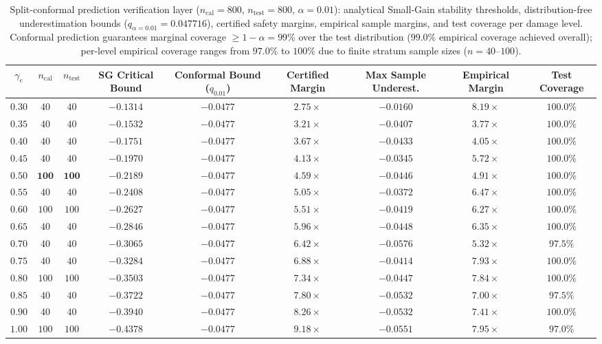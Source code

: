 \documentclass[review,12pt]{elsarticle}
\begin{document}
\begin{table}[!htbp]
\centering
\caption{Split-conformal prediction verification layer ($n_{\text{cal}} = 800$, $n_{\text{test}} = 800$, $\alpha = 0.01$): analytical Small-Gain stability thresholds, distribution-free underestimation bounds ($q_{\alpha=0.01} = 0.047716$), certified safety margins, empirical sample margins, and test coverage per damage level. Conformal prediction guarantees marginal coverage $\ge 1-\alpha = 99\%$ over the test distribution ($99.0\%$ empirical coverage achieved overall); per-level empirical coverage ranges from $97.0\%$ to $100\%$ due to finite stratum sample sizes ($n=40\text{--}100$).}
\label{tab:conformal_certification}
\scriptsize
\setlength{\tabcolsep}{3pt}
\begin{adjustbox}{max width=\textwidth}
\begin{tabular}{ccccccccc}
\toprule
$\gamma_e$ & $n_{\text{cal}}$ & $n_{\text{test}}$ & SG Critical Bound & Conformal Bound ($q_{0.01}$) & Certified Margin & Max Sample Underest. & Empirical Margin & Test Coverage \\
\midrule
$0.30$ & $40$ & $40$ & $-0.1314$ & $-0.0477$ & $\bm{2.75\times}$ & $-0.0160$ & $8.19\times$ & $100.0\%$ \\
$0.35$ & $40$ & $40$ & $-0.1532$ & $-0.0477$ & $\bm{3.21\times}$ & $-0.0407$ & $3.77\times$ & $100.0\%$ \\
$0.40$ & $40$ & $40$ & $-0.1751$ & $-0.0477$ & $3.67\times$ & $-0.0433$ & $4.05\times$ & $100.0\%$ \\
$0.45$ & $40$ & $40$ & $-0.1970$ & $-0.0477$ & $4.13\times$ & $-0.0345$ & $5.72\times$ & $100.0\%$ \\
$\bm{0.50}$ & $\bm{100}$ & $\bm{100}$ & $\bm{-0.2189}$ & $\bm{-0.0477}$ & $\bm{4.59\times}$ & $\bm{-0.0446}$ & $\bm{4.91\times}$ & $\bm{100.0\%}$ \\
$0.55$ & $40$ & $40$ & $-0.2408$ & $-0.0477$ & $5.05\times$ & $-0.0372$ & $6.47\times$ & $100.0\%$ \\
$0.60$ & $100$ & $100$ & $-0.2627$ & $-0.0477$ & $5.51\times$ & $-0.0419$ & $6.27\times$ & $100.0\%$ \\
$0.65$ & $40$ & $40$ & $-0.2846$ & $-0.0477$ & $5.96\times$ & $-0.0448$ & $6.35\times$ & $100.0\%$ \\
$0.70$ & $40$ & $40$ & $-0.3065$ & $-0.0477$ & $6.42\times$ & $-0.0576$ & $5.32\times$ & $97.5\%$ \\
$0.75$ & $40$ & $40$ & $-0.3284$ & $-0.0477$ & $6.88\times$ & $-0.0414$ & $7.93\times$ & $100.0\%$ \\
$0.80$ & $100$ & $100$ & $-0.3503$ & $-0.0477$ & $7.34\times$ & $-0.0447$ & $7.84\times$ & $100.0\%$ \\
$0.85$ & $40$ & $40$ & $-0.3722$ & $-0.0477$ & $7.80\times$ & $-0.0532$ & $7.00\times$ & $97.5\%$ \\
$0.90$ & $40$ & $40$ & $-0.3940$ & $-0.0477$ & $8.26\times$ & $-0.0532$ & $7.41\times$ & $100.0\%$ \\
$1.00$ & $100$ & $100$ & $-0.4378$ & $-0.0477$ & $9.18\times$ & $-0.0551$ & $7.95\times$ & $97.0\%$ \\
\bottomrule
\end{tabular}
\end{adjustbox}
\end{table}
\end{document}
